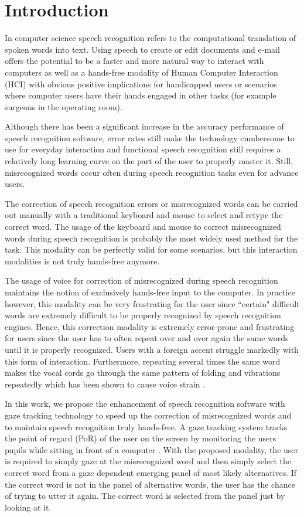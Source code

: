 \documentclass[]{article}
\begin{document}
\section{Introduction}
In computer science speech recognition refers to the computational translation of spoken words into text.
Using speech to create or edit documents and e-mail offers the potential to be a faster and more natural way to interact
with computers as well as a hands-free modality of Human Computer Interaction (HCI) with obvious positive implications
for handicapped users or scenarios where computer users have their hands engaged in other tasks (for example surgeons in
the operating room).

Although there has been a significant increase in the accuracy performance of speech recognition software, error
rates still make the technology cumbersome to use for everyday interaction and functional speech recognition still
requires a relatively long learning curve on the part of the user to properly master it. Still, misrecognized words
occur often during speech recognition tasks even for advance users. 

The correction of speech recognition errors or misrecognized words can be carried out manually with a traditional
keyboard and mouse to select and retype the correct word. The usage  of the keyboard and mouse to correct misrecognized
words  during speech recognition is probably  the most widely used  method for the task. This modality can be
perfectly valid for some scenarios, but this interaction modalities is not truly hands-free anymore.


The usage of voice for correction of misrecognized during speech recognition maintains the notion of exclusively
hands-free input to the computer. In practice however, this modality can be very frustrating for the user since
``certain" difficult words are extremely difficult to be properly recognized by speech recognition engines. Hence, this
correction modality is extremely error-prone and frustrating for users since the user has to often repeat over and over
again the same words until it is properly recognized. Users with a foreign accent struggle markedly with this form of
interaction. Furthermore, repeating several times the same word makes the vocal cords go through the same pattern of
folding and vibrations repeatedly which has been shown to cause voice strain \cite{voiceproblems}.

 
In this work, we propose the enhancement of speech recognition software with gaze tracking technology to speed up the
correction of misrecognized words and to maintain speech recognition truly hands-free. A gaze tracking system tracks the
point of regard (PoR) of the user on the screen by monitoring the users pupils while sitting in front of a computer
\cite{Rozado2012a}. With the proposed modality, the user is required to simply gaze at the misrecognized word and then
simply select  the correct word from a gaze dependent emerging panel of most likely alternatives. If the correct word is
not in the panel of alternative words, the user has the chance of trying to utter it again. The correct word is selected
from the panel just by looking at it.
\end{document}
